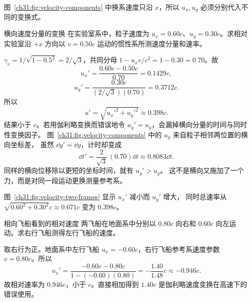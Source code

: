 \begin{center}
\label{ch31:fig:velocity-components}
\end{center}
图~\ref{ch31:fig:velocity-components} 中换系速度只沿 $x$，所以 $u_x,u_y$ 必须分别代入不同的变换式。

\begin{origexamplebox}{横向速度分量的变换}
在实验室系中，粒子速度为 $u_x=0.60c$、$u_y=0.30c$。求相对实验室沿 $+x$ 方向以 $v=0.50c$ 运动的惯性系所测速度分量和速率。
\end{origexamplebox}
\begin{xesolution}
$\gamma_v=1/\sqrt{1-0.5^2}=2/\sqrt3$，共同分母
$1-u_xv/c^2=1-0.30=0.70$。故
\[
 u_x'=\frac{0.60c-0.50c}{0.70}=0.1429c,
\]
\[
 u_y'=\frac{0.30c}{(2/\sqrt3)(0.70)}=0.3712c.
\]
所以
\[
 \boxed{u'=\sqrt{u_x'^2+u_y'^2}\approx0.398c}.
\]
结果小于 $c$。若用伽利略变换而错误地令 $u_y'=u_y$，会漏掉横向分量的时间与同时性变换因子。
图~\ref{ch31:fig:velocity-components} 中的 $u_y$ 来自粒子相邻两位置的横向坐标差，
虽然 $\dd y'=\dd y$，计时却变成
\[
 \dd t'=\frac2{\sqrt3}\,(0.70)\dd t\approx0.8083\dd t.
\]
同样的横向位移除以更短的坐标时间，就有 $u_y'>u_y$。
这不是横向又施加了一个力，而是对同一段运动更换测量参考系。
\begin{center}

\label{ch31:fig:velocity-two-frames}
\end{center}
图~\ref{ch31:fig:velocity-two-frames} 显示 $u_x'$ 减小而 $u_y'$ 增大，
同时总速率从 $\sqrt{0.60^2+0.30^2}c\approx0.671c$ 变为 $0.398c$。
\end{xesolution}

\begin{origexamplebox}{相向飞船看到的相对速度}
两飞船在地面系中分别以 $0.80c$ 向右和 $0.60c$ 向左运动。求右行飞船测得左行飞船的速度。
\end{origexamplebox}
\begin{xesolution}
取右行为正。地面系中左行飞船 $u_x=-0.60c$，右行飞船参考系速度参数 $v=0.80c$。所以
\[
 u_x'=\frac{-0.60c-0.80c}{1-(-0.60)(0.80)}
 =-\frac{1.40}{1.48}c\approx-0.946c.
\]
故相对速率为 $\boxed{0.946c}$，小于 $c$。直接相加得到 $1.40c$ 是伽利略速度变换在高速下的错误使用。
\end{xesolution}

